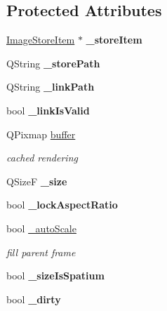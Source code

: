 \subsection*{Protected Attributes}
\begin{DoxyCompactItemize}
\item 
\mbox{\label{class_ms_1_1_image_a41a3e0b265e32453ab5b887ade2a4906}} 
\hyperlink{class_ms_1_1_image_store_item}{Image\+Store\+Item} $\ast$ {\bfseries \+\_\+store\+Item}
\item 
\mbox{\label{class_ms_1_1_image_a07127ae0be809bb7be0d41126368198a}} 
Q\+String {\bfseries \+\_\+store\+Path}
\item 
\mbox{\label{class_ms_1_1_image_a8e33bf59e8d7183d8440ee1ea734b75e}} 
Q\+String {\bfseries \+\_\+link\+Path}
\item 
\mbox{\label{class_ms_1_1_image_a44ec0726fa47faa977734768d54bb9f7}} 
bool {\bfseries \+\_\+link\+Is\+Valid}
\item 
\mbox{\label{class_ms_1_1_image_a4238c2e8d0a09335fbb617e39bf37174}} 
Q\+Pixmap \hyperlink{class_ms_1_1_image_a4238c2e8d0a09335fbb617e39bf37174}{buffer}
\begin{DoxyCompactList}\small\item\em cached rendering \end{DoxyCompactList}\item 
\mbox{\label{class_ms_1_1_image_af0d33eb2e7371ed3a4aecd326a9771c0}} 
Q\+SizeF {\bfseries \+\_\+size}
\item 
\mbox{\label{class_ms_1_1_image_ae507e31077e0ebbfafe1568ed0c75ee3}} 
bool {\bfseries \+\_\+lock\+Aspect\+Ratio}
\item 
\mbox{\label{class_ms_1_1_image_a7a566e89b6a40898ace85f92f09ba2e0}} 
bool \hyperlink{class_ms_1_1_image_a7a566e89b6a40898ace85f92f09ba2e0}{\+\_\+auto\+Scale}
\begin{DoxyCompactList}\small\item\em fill parent frame \end{DoxyCompactList}\item 
\mbox{\label{class_ms_1_1_image_a4f863f18c712c011437834f953756604}} 
bool {\bfseries \+\_\+size\+Is\+Spatium}
\item 
\mbox{\label{class_ms_1_1_image_a294ef958af1c82d46f1c83bf7632a1b0}} 
bool {\bfseries \+\_\+dirty}
\end{DoxyCompactItemize}

